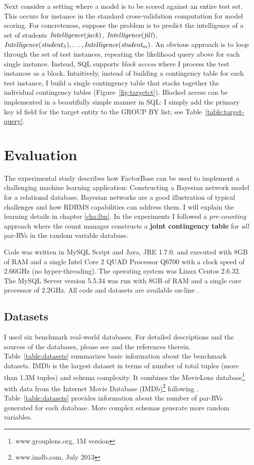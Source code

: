 \documentclass{sfuthesis}
\begin{document}
Next consider a setting where a model is to be scored against an entire test set. This occurs for instance in the standard cross-validation computation for model scoring. For concreteness, suppose the problem is to predict the intelligence of a set of students
 $\it{Intelligence}(jack)$, $\it{Intelligence}(jill)$, $\it{Intelligence}(student_{3}),\ldots, \it{Intelligence}(student_{m})$.
An obvious approach is to loop through the set of test instances, repeating the likelihood query above for each single instance. Instead,  SQL supports {\em block access} where I  process the test instances as a block. Intuitively, instead of building a contingency table for each test instance, I  build a single contingency table that stacks together the individual contingency tables (Figure~\ref{fig:targetct}). Blocked access can be implemented in a beautifully simple manner in SQL: I  simply add the primary key id field for the target entity to the GROUP BY list; see Table~\ref{table:target-query}. 

\section{Evaluation} 
The experimental study describes how FactorBase  can be used to implement a challenging machine learning application: Constructing a Bayesian network model for a relational database. Bayesian networks are a good illustration of typical challenges and how RDBMS capabilities can address them. I will explain the learning details in chapter \ref{cha:lbn}. 
In the experiments I  followed a {\em pre-counting} approach where the count manager constructs a \textbf{joint contingency table} for {\em all} par-RVs in the random variable database. 


Code was written in MySQL Script and Java, JRE 1.7.0.  and executed with 8GB of RAM and a single Intel Core 2 QUAD Processor Q6700 with a clock speed of 2.66GHz (no hyper-threading). The operating system was Linux Centos 2.6.32.  The MySQL Server version 5.5.34 was run with 8GB of RAM and a single core processor of 2.2GHz.  All code and datasets are available on-line \cite{bib:bbsite}. 


\subsection{Datasets} \label{sec:datasets}
I  used six benchmark real-world databases. For detailed descriptions and  the sources of the databases, please see \cite{bib:bbsite} and the references therein. Table~\ref{table:datasets} summarizes basic information about the benchmark datasets.  
IMDb is the largest dataset in terms of number of total tuples (more than 1.3M tuples) and schema complexity. %
It combines the MovieLens database\footnote{www.grouplens.org, 1M version} with data from the Internet Movie Database (IMDb)\footnote{www.imdb.com, July 2013} following \cite{Peralta2007}. Table~\ref{table:datasets} provides information about the number of par-RVs generated for each database. More complex schemas 
generate more random variables. 
\end{document}

